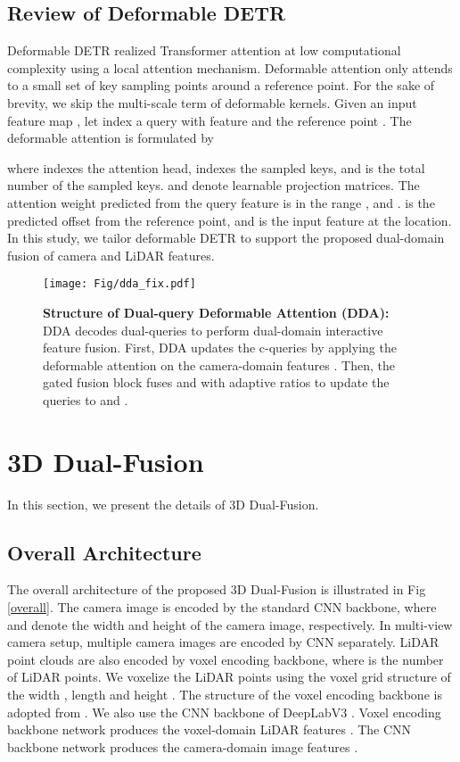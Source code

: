 \documentclass[lettersize,journal]{IEEEtran}
\begin{document}
\subsection{Review of Deformable DETR}

Deformable DETR \cite{def-detr} realized Transformer attention \cite{transformer} at low computational complexity using a local attention mechanism. 
Deformable attention only attends to a small set of key sampling points around a reference point. For the sake of brevity, we skip the multi-scale term of deformable kernels. Given an input feature map , let  index a query with feature  and the reference point . The deformable attention is formulated by

where  indexes the attention head,  indexes the sampled keys, and  is the total number of the sampled keys.  and  denote learnable projection matrices. The attention weight  predicted from the query feature  is in the range , and .  is the predicted offset from the reference point, and  is the input feature at the  location. In this study, we tailor deformable DETR to support the proposed dual-domain fusion of camera and LiDAR features.

\begin{figure*}[tbh]
	\centering
        \centerline{\texttt{[image: Fig/dda\_fix.pdf]}}
    	\caption {\textbf{Structure of Dual-query Deformable Attention  (DDA):} DDA decodes dual-queries to perform dual-domain interactive feature fusion. First, DDA updates the c-queries  by  applying the deformable attention on the camera-domain features . Then, the gated fusion block fuses  and   with adaptive ratios to update the queries to  and . }
	\label{dda}
\end{figure*}

\section{3D Dual-Fusion}

In this section, we present the details of 3D Dual-Fusion. 

\subsection{Overall Architecture}
The overall architecture of the proposed 3D Dual-Fusion is illustrated in Fig \ref{overall}. The camera image  is encoded by the standard CNN backbone, where  and  denote the width and height of the camera image, respectively. In multi-view camera setup, multiple camera images are encoded by CNN separately. LiDAR point clouds  are also encoded by voxel encoding backbone, where  is the number of LiDAR points. We voxelize the LiDAR points using the voxel grid structure of the width , length  and height .  The structure of the voxel encoding backbone is adopted from  \cite{second}. We also use the CNN backbone of  DeepLabV3 \cite{deeplabv3}. Voxel encoding backbone network produces the voxel-domain LiDAR features . The CNN backbone network produces the camera-domain image features .
\end{document}
